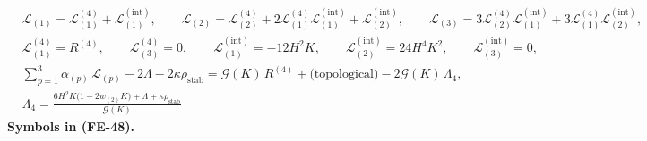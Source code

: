 \documentclass[
  10pt,
]{article}
\begin{document}
\[
\begin{aligned}
&\mathcal{L}_{(1)} = \mathcal{L}^{(4)}_{(1)} + \mathcal{L}^{(\mathrm{int})}_{(1)},\qquad
 \mathcal{L}_{(2)} = \mathcal{L}^{(4)}_{(2)} + 2\mathcal{L}^{(4)}_{(1)}\mathcal{L}^{(\mathrm{int})}_{(1)}
 + \mathcal{L}^{(\mathrm{int})}_{(2)},\qquad
 \mathcal{L}_{(3)} = 3\mathcal{L}^{(4)}_{(2)}\mathcal{L}^{(\mathrm{int})}_{(1)} +
 3\mathcal{L}^{(4)}_{(1)}\mathcal{L}^{(\mathrm{int})}_{(2)},\\
&\mathcal{L}^{(4)}_{(1)} = R^{(4)},\qquad \mathcal{L}^{(4)}_{(3)} = 0,\qquad
 \mathcal{L}^{(\mathrm{int})}_{(1)} = -12H^2K,\qquad
 \mathcal{L}^{(\mathrm{int})}_{(2)} = 24H^4K^2,\qquad \mathcal{L}^{(\mathrm{int})}_{(3)} = 0,\\
&\sum_{p=1}^{3}\alpha_{(p)}\,\mathcal{L}_{(p)} - 2\Lambda - 2\kappa\rho_{\mathrm{stab}}
 = \mathcal{G}(K)\,R^{(4)} + \text{(topological)} - 2\mathcal{G}(K)\,\Lambda_4,\\
&\Lambda_4 = \frac{6H^2K\big(1 - 2w_{(2)}K\big) + \Lambda + \kappa\rho_{\mathrm{stab}}}{\mathcal{G}(K)}
\end{aligned} \tag{FE-48}
\] \textbf{Symbols in (FE-48).}
\end{document}
